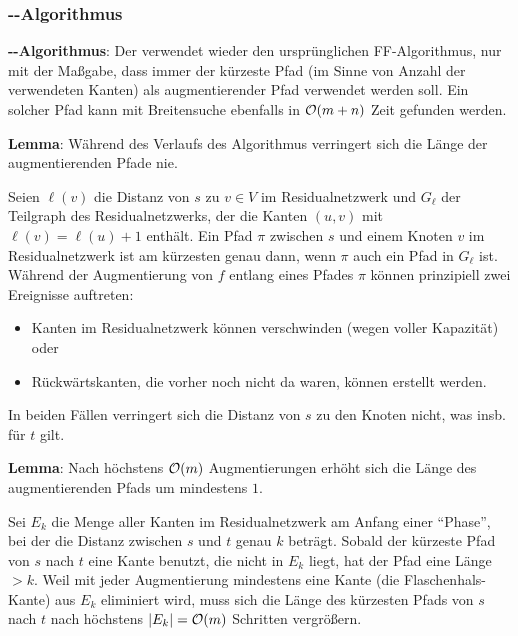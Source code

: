 \subsubsection{%
    --Algorithmus%
}

\textbf{--Algorithmus}:
Der  verwendet
wieder den ursprünglichen FF-Algorithmus, nur mit der Maßgabe, dass
immer der kürzeste Pfad (im Sinne von Anzahl der verwendeten Kanten) als augmentierender Pfad
verwendet werden soll.
Ein solcher Pfad kann mit Breitensuche ebenfalls in $\mathcal{O}(m + n)$ Zeit gefunden werden.

\linie

\textbf{Lemma}:
Während des Verlaufs des Algorithmus verringert sich die Länge der augmentierenden Pfade nie.

\begin{Beweis}
    Seien $\ell(v)$ die Distanz von $s$ zu $v \in V$ im Residualnetzwerk und
    $G_\ell$ der Teilgraph des Residualnetzwerks, der die Kanten $(u, v)$ mit
    $\ell(v) = \ell(u) + 1$ enthält.
    Ein Pfad $\pi$ zwischen $s$ und einem Knoten $v$ im Residualnetzwerk ist am kürzesten
    genau dann, wenn $\pi$ auch ein Pfad in $G_\ell$ ist.
    Während der Augmentierung von $f$ entlang eines Pfades $\pi$ können prinzipiell zwei Ereignisse
    auftreten:
    \begin{itemize}
        \item
        Kanten im Residualnetzwerk können verschwinden (wegen voller Kapazität) oder

        \item
        Rückwärtskanten, die vorher noch nicht da waren, können erstellt werden.
    \end{itemize}
    In beiden Fällen verringert sich die Distanz von $s$ zu den Knoten nicht,
    was insb. für $t$ gilt.
\end{Beweis}

\textbf{Lemma}:
Nach höchstens $\mathcal{O}(m)$ Augmentierungen erhöht sich die Länge des augmentierenden Pfads um
mindestens $1$.

\begin{Beweis}
    Sei $E_k$ die Menge aller Kanten im Residualnetzwerk am Anfang einer "`Phase"', bei der
    die Distanz zwischen $s$ und $t$ genau $k$ beträgt.
    Sobald der kürzeste Pfad von $s$ nach $t$ eine Kante benutzt, die nicht in $E_k$ liegt,
    hat der Pfad eine Länge $> k$.
    Weil mit jeder Augmentierung mindestens eine Kante (die Flaschenhals-Kante) aus $E_k$
    eliminiert wird, muss sich die Länge des kürzesten Pfads von $s$ nach $t$ nach höchstens
    $|E_k| = \mathcal{O}(m)$ Schritten vergrößern.
\end{Beweis}

